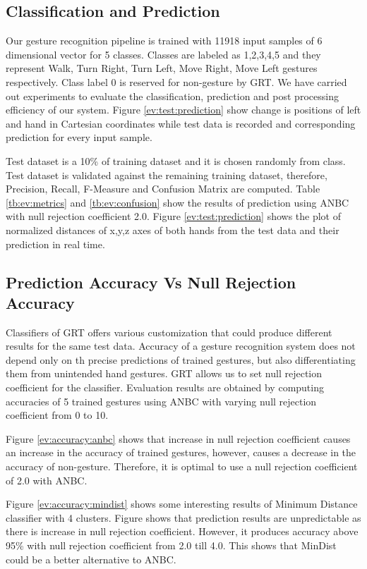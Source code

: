  

\subsection{Classification and Prediction} Our gesture recognition pipeline is trained with 11918 input samples of 6 dimensional vector for 5 classes. Classes are labeled as 1,2,3,4,5 and they represent Walk, Turn Right, Turn Left, Move Right, Move Left gestures respectively. Class label 0 is reserved for non-gesture by GRT. We have carried out experiments to evaluate the classification, prediction and post processing efficiency of our system. Figure \ref{ev:test:prediction} show change is positions of left and hand in Cartesian coordinates while test data is recorded and corresponding prediction for every input sample.

Test dataset is a 10\% of training dataset and it is chosen randomly from class. Test dataset is validated against the remaining training dataset, therefore, Precision, Recall, F-Measure and Confusion Matrix are computed. Table \ref{tb:ev:metrics} and \ref{tb:ev:confusion} show the results of prediction using ANBC with null rejection coefficient 2.0. Figure \ref{ev:test:prediction} shows the plot of normalized distances of x,y,z axes of both hands from the test data and their prediction in real time.

\subsection{Prediction Accuracy Vs Null Rejection Accuracy} \label{sec:ev:accuracy} Classifiers of GRT offers various customization that could produce different results for the same test data. Accuracy of a gesture recognition system does not depend only on th precise predictions of trained gestures, but also differentiating them from unintended hand gestures. GRT allows us to set null rejection coefficient for the classifier. Evaluation results are obtained by computing accuracies of 5 trained gestures using ANBC with varying null rejection coefficient from 0 to 10.

Figure \ref{ev:accuracy:anbc} shows that increase in null rejection coefficient causes an increase in the accuracy of trained gestures, however, causes a decrease in the accuracy of non-gesture. Therefore, it is optimal to use a null rejection coefficient of 2.0 with ANBC.

Figure \ref{ev:accuracy:mindist} shows some interesting results of Minimum Distance classifier with 4 clusters. Figure shows that prediction results are unpredictable as there is increase in null rejection coefficient. However, it produces accuracy above 95\% with null rejection coefficient from 2.0 till 4.0. This shows that MinDist could be a better alternative to ANBC. 

 



